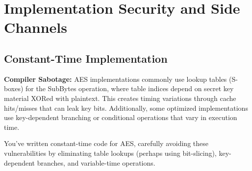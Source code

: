 \documentclass[10pt,a4paper,american]{exam}
\begin{document}
\section*{Implementation Security and Side Channels}
\begin{questions}
	\subsection*{Constant-Time Implementation}

	\question[5] \textbf{Compiler Sabotage:}
	AES implementations commonly use lookup tables (S-boxes) for the SubBytes operation, where table indices depend on secret key material XORed with plaintext. This creates timing variations through cache hits/misses that can leak key bits. Additionally, some optimized implementations use key-dependent branching or conditional operations that vary in execution time.

	You've written constant-time code for AES, carefully avoiding these vulnerabilities by eliminating table lookups (perhaps using bit-slicing), key-dependent branches, and variable-time operations.


\end{questions}
\end{document}
